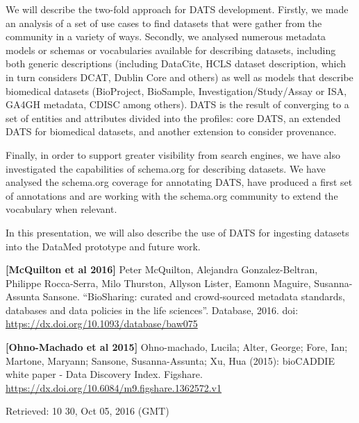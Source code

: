 \documentclass[runningheads,a4paper]{llncs}
\begin{document}
We will describe the two-fold approach for DATS development. Firstly, we made an analysis of a set of use cases to find datasets that were gather from the community in a variety of ways. Secondly, we analysed numerous metadata models or schemas or vocabularies available for describing datasets, including both generic descriptions (including DataCite, HCLS dataset description, which in turn considers DCAT, Dublin Core and others) as well as models that describe biomedical datasets (BioProject, BioSample, Investigation/Study/Assay or ISA, GA4GH metadata, CDISC among others). DATS is the result of converging to a set of entities and attributes divided into the profiles: core DATS, an extended DATS for biomedical datasets, and another extension to consider provenance. 

Finally, in order to support greater visibility from search engines, we have also investigated the capabilities of schema.org for describing datasets. We have analysed the schema.org coverage for annotating DATS, have produced a first set of annotations and are working with the schema.org community to extend the vocabulary when relevant.

In this presentation, we will also describe the use of DATS for ingesting datasets into the DataMed prototype and future work.

\begin{thebibliography}{4}


{\bf [McQuilton et al 2016] }Peter McQuilton, Alejandra Gonzalez-Beltran, Philippe Rocca-Serra, Milo Thurston, Allyson Lister, Eamonn Maguire, Susanna-Assunta Sansone. ``BioSharing: curated and crowd-sourced metadata standards, databases and data policies in the life sciences''. Database, 2016. doi: \url{https://dx.doi.org/10.1093/database/baw075}

{\bf [Ohno-Machado et al 2015]} Ohno-machado, Lucila; Alter, George; Fore, Ian; Martone, Maryann; Sansone, Susanna-Assunta; Xu, Hua (2015): bioCADDIE white paper - Data Discovery Index. Figshare. \url{https://dx.doi.org/10.6084/m9.figshare.1362572.v1}

Retrieved: 10 30, Oct 05, 2016 (GMT)

\end{thebibliography}
\end{document}
